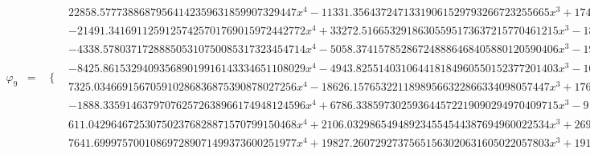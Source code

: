\documentclass{article}
\begin{document}
\begin{landscape}
\begin{eqnarray*}
\begin{array}{cc}
\end{array}\\
\varphi_9 & = & \begin{array}{cc}
 \{ & 
\begin{array}{cc}
 22858.57773886879564142359631859907329447 x^4-11331.35643724713319061529793266723255665 x^3+1749.057658954105995361392300293523871160 x^2-81.58023214357279735835657362169890553478 x-0.6732891503713761432960483427535173247451 & x\geq 0\land x<\frac{1}{4} \\
 -21491.34169112591257425701769015972442772 x^4+33272.51665329186305595173637215770461215 x^3-18889.85109702619970032522454547769546494 x^2+4646.517905745187517733671292656659900998 x-416.4596706400473363209969745928176001123 & x\geq \frac{1}{4}\land x<\frac{1}{2} \\
 -4338.578037172888505310750085317323454714 x^4-5058.374157852867248886468405880120590406 x^3-1935.922335095850460965933608920937395155 x^2-258.0735544352774541874995328106644749943 x-5.874092001632689320719458204371032134842 & x\geq -\frac{1}{2}\land x<-\frac{1}{4} \\
 -8425.861532940935689019916143334651108029 x^4-4943.825514031064418184960550152377201403 x^3-1029.069512108259187830936487392936528696 x^2-81.58023214357279735835657362169890553478 x-0.6732891503713761432960483427535173247451 & x\geq -\frac{1}{4}\land x<0 \\
 7325.034669156705910286836875390878027256 x^4-18626.15765322118989566322866334098057447 x^3+17620.87452436465623064297320066599010113 x^2-7348.390165902187941795229959638313002585 x+1139.623725632394374369283934109170455055 & x\geq \frac{1}{2}\land x<\frac{3}{4} \\
 -1888.335914637970762572638966174948124596 x^4+6786.338597302593644572219090294970409715 x^3-9105.138382790652897796757291854910450614 x^2+5404.604632225407912167413177524702170465 x-1197.468932099377896370236009789814004971 & x\geq \frac{3}{4}\land x<1 \\
 611.0429646725307502376828871570799150468 x^4+2106.032986549489234554544387694960022534 x^3+2694.597235541052848391542826867542479732 x^2+1515.267370123760994070184039278524552047 x+315.6601564596666299955027129488621798031 & x\geq -1\land x<-\frac{3}{4} \\
 7641.699975700108697289071499373600251977 x^4+19827.26072927375651563020631605022057803 x^3+19141.45642935617062874786049802978436713 x^2+8145.218051108274413438699325037763264304 x+1288.364004743403617466026935180272311330 & x\geq -\frac{3}{4}\land x<-\frac{1}{2}
\end{array}

\end{array}\end{eqnarray*}
\end{landscape}
\end{document}
